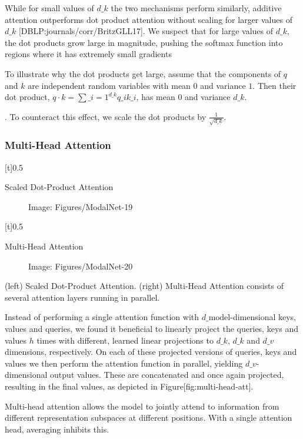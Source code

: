\documentclass[11pt,a4paper]{article}
\begin{document}
While for small values of $d\_k$ the two mechanisms perform similarly, additive attention outperforms dot product attention without scaling for larger values of $d\_k$ [DBLP:journals/corr/BritzGLL17]. We suspect that for large values of $d\_k$, the dot products grow large in magnitude, pushing the softmax function into regions where it has extremely small gradients

To illustrate why the dot products get large, assume that the components of $q$ and $k$ are independent random variables with mean $0$ and variance $1$. Then their dot product, $q \cdot k = \sum\_{i=1}^{d\_k} q\_ik\_i$, has mean $0$ and variance $d\_k$.

. To counteract this effect, we scale the dot products by $\frac{1}{\sqrt{d\_k}}$.

\subsubsection{Multi-Head Attention}

[t]0.5

Scaled Dot-Product Attention

\begin{figure}[h]
\caption{Image: Figures/ModalNet-19}
\end{figure}

[t]0.5

Multi-Head Attention

\begin{figure}[h]
\caption{Image: Figures/ModalNet-20}
\end{figure}

(left) Scaled Dot-Product Attention. (right) Multi-Head Attention consists of several attention layers running in parallel.

Instead of performing a single attention function with $d\_{\text{model}}$-dimensional keys, values and queries, we found it beneficial to linearly project the queries, keys and values $h$ times with different, learned linear projections to $d\_k$, $d\_k$ and $d\_v$ dimensions, respectively.
On each of these projected versions of queries, keys and values we then perform the attention function in parallel, yielding $d\_v$-dimensional output values. These are concatenated and once again projected, resulting in the final values, as depicted in Figure[fig:multi-head-att].

Multi-head attention allows the model to jointly attend to information from different representation subspaces at different positions. With a single attention head, averaging inhibits this.
\end{document}
